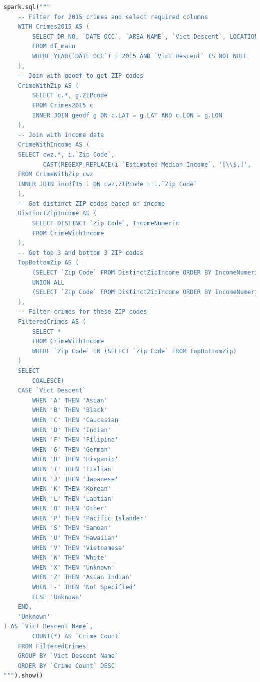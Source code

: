 \documentclass{article}
\begin{document}
\begin{lstlisting}[language=Python, caption={Query 3 - SQL}]
spark.sql("""
    -- Filter for 2015 crimes and select required columns
    WITH Crimes2015 AS (
        SELECT DR_NO, `DATE OCC`, `AREA NAME`, `Vict Descent`, LOCATION, LAT, LON
        FROM df_main
        WHERE YEAR(`DATE OCC`) = 2015 AND `Vict Descent` IS NOT NULL
    ),
    -- Join with geodf to get ZIP codes
    CrimeWithZip AS (
        SELECT c.*, g.ZIPcode
        FROM Crimes2015 c
        INNER JOIN geodf g ON c.LAT = g.LAT AND c.LON = g.LON
    ),
    -- Join with income data
    CrimeWithIncome AS (
    SELECT cwz.*, i.`Zip Code`, 
           CAST(REGEXP_REPLACE(i.`Estimated Median Income`, '[\\$,]', '') AS DOUBLE) AS IncomeNumeric
    FROM CrimeWithZip cwz
    INNER JOIN incdf15 i ON cwz.ZIPcode = i.`Zip Code`
    ),
    -- Get distinct ZIP codes based on income
    DistinctZipIncome AS (
        SELECT DISTINCT `Zip Code`, IncomeNumeric
        FROM CrimeWithIncome
    ),
    -- Get top 3 and bottom 3 ZIP codes
    TopBottomZip AS (
        (SELECT `Zip Code` FROM DistinctZipIncome ORDER BY IncomeNumeric DESC LIMIT 3)
        UNION ALL
        (SELECT `Zip Code` FROM DistinctZipIncome ORDER BY IncomeNumeric ASC LIMIT 3)
    ),
    -- Filter crimes for these ZIP codes
    FilteredCrimes AS (
        SELECT *
        FROM CrimeWithIncome
        WHERE `Zip Code` IN (SELECT `Zip Code` FROM TopBottomZip)
    )
    SELECT 
        COALESCE(
    CASE `Vict Descent`
        WHEN 'A' THEN 'Asian'
        WHEN 'B' THEN 'Black'
        WHEN 'C' THEN 'Caucasian'
        WHEN 'D' THEN 'Indian'
        WHEN 'F' THEN 'Filipino'
        WHEN 'G' THEN 'German'
        WHEN 'H' THEN 'Hispanic'
        WHEN 'I' THEN 'Italian'
        WHEN 'J' THEN 'Japanese'
        WHEN 'K' THEN 'Korean'
        WHEN 'L' THEN 'Laotian'
        WHEN 'O' THEN 'Other'
        WHEN 'P' THEN 'Pacific Islander'
        WHEN 'S' THEN 'Samoan'
        WHEN 'U' THEN 'Hawaiian'
        WHEN 'V' THEN 'Vietnamese'
        WHEN 'W' THEN 'White'
        WHEN 'X' THEN 'Unknown'
        WHEN 'Z' THEN 'Asian Indian'
        WHEN '-' THEN 'Not Specified'
        ELSE 'Unknown'
    END,
    'Unknown'
) AS `Vict Descent Name`,
        COUNT(*) AS `Crime Count`
    FROM FilteredCrimes
    GROUP BY `Vict Descent Name`
    ORDER BY `Crime Count` DESC
""").show()    
\end{lstlisting}
\end{document}
